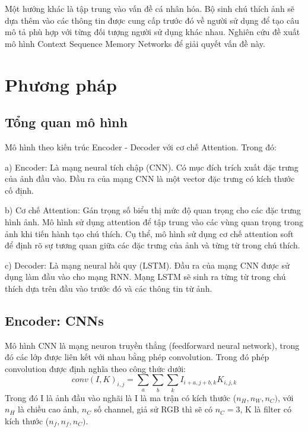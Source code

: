 \documentclass[conference]{IEEEtran}
\begin{document}
Một hướng khác là tập trung vào vấn đề cá nhân hóa. Bộ sinh chú thích ảnh sẽ dựa thêm vào các thông tin được cung cấp trước đó về người sử dụng để tạo câu mô tả phù hợp với từng đối tượng người sử dụng khác nhau. Nghiên cứu \cite{chunseong2017attend} đề xuất mô hình Context Sequence Memory Networks để giải quyết vấn đề này.

\section{Phương pháp}
\subsection{Tổng quan mô hình}
Mô hình theo kiến trúc Encoder - Decoder với cơ chế Attention. Trong đó:

a) Encoder: Là mạng neural tích chập (CNN). Có mục đích trích xuất đặc trưng của ảnh đầu vào. Đầu ra của mạng CNN là một vector đặc trưng có kích thước cố định.

b) Cơ chế Attention: Gán trọng số biểu thị mức độ quan trọng cho các đặc trưng hình ảnh. Mô hình sử dụng attention để tập trung vào các vùng quan trọng trong ảnh khi tiến hành tạo chú thích. Cụ thể, mô hình sử dụng cơ chế attention soft để định rõ sự tương quan giữa các đặc trưng của ảnh và từng từ trong chú thích.

c) Decoder: Là mạng neural hồi quy (LSTM). Đầu ra của mạng CNN được sử dụng làm đầu vào cho mạng RNN. Mạng LSTM sẽ sinh ra từng từ trong chú thích dựa trên đầu vào trước đó và các thông tin từ ảnh. 


\subsection{Encoder: CNNs}
Mô hình CNN là mạng neuron truyền thẳng (feedforward neural network), trong đó các lớp được liên kết với nhau bằng phép convolution. Trong đó phép convolution được định nghĩa theo công thức dưới:
$$conv(I,K)_{i,j}=\sum_{a}\sum_{b}\sum_{k}I_{i+a,j+b,k}K_{i,j,k}$$
Trong đó I là ảnh đầu vào nghãi là I là ma trận có kích thước ($n_{H},n_{W},n_{C})$, với $n_{H}$ là chiều cao ảnh, $n_{C}$ số channel, giả sử RGB thì sẽ có $n_{C}=3$, K là filter có kích thước ($n_{f},n_{f},n_{C})$.
\end{document}

